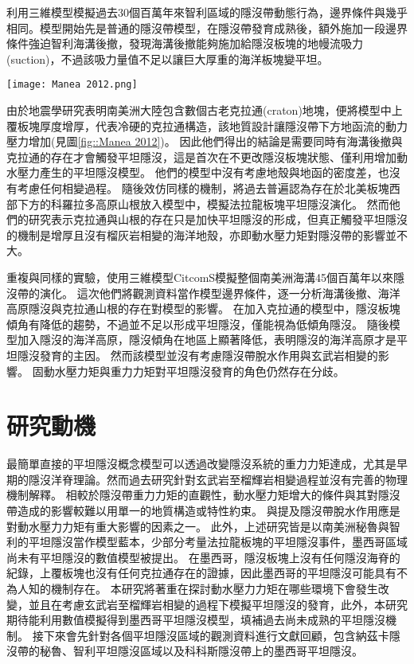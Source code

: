 \citealp{Manea2012Chile}利用三維模型模擬過去30個百萬年來智利區域的隱沒帶動態行為，邊界條件與\citealp{Thermal2012}幾乎相同。模型開始先是普通的隱沒帶模型，在隱沒帶發育成熟後，額外施加一段邊界條件強迫智利海溝後撤，發現海溝後撤能夠施加給隱沒板塊的地幔流吸力(suction)，不過該吸力量值不足以讓巨大厚重的海洋板塊變平坦。
\begin{figure*}[ht!]
    \centering
    \texttt{[image: Manea 2012.png]}
    \caption{\citealp{Manea2012Chile}中的智利平坦隱沒模型，模型中同時加入海溝後撤與增厚大陸岩石圈可以讓平坦隱沒發育。
    }
    \label{fig::Manea 2012}
\end{figure*}
由於地震學研究表明南美洲大陸包含數個古老克拉通(craton)地塊，\citealp{Manea2012Chile}便將模型中上覆板塊厚度增厚，代表冷硬的克拉通構造，該地質設計讓隱沒帶下方地函流的動力壓力增加(見圖\ref{fig::Manea 2012})。
因此他們得出的結論是需要同時有海溝後撤與克拉通的存在才會觸發平坦隱沒，這是首次在不更改隱沒板塊狀態、僅利用增加動水壓力產生的平坦隱沒模型。
他們的模型中沒有考慮地殼與地函的密度差，也沒有考慮任何相變過程。
隨後\citealp{Liu2016}效仿同樣的機制，將過去普遍認為存在於北美板塊西部下方的科羅拉多高原山根放入模型中，模擬法拉龍板塊平坦隱沒演化。
然而他們的研究表示克拉通與山根的存在只是加快平坦隱沒的形成，但真正觸發平坦隱沒的機制是增厚且沒有榴灰岩相變的海洋地殼，亦即動水壓力矩對隱沒帶的影響並不大。


\citealp{Hu2016}重複與\citealp{Manea2012Chile}同樣的實驗，使用三維模型CitcomS模擬整個南美洲海溝45個百萬年以來隱沒帶的演化。
這次他們將觀測資料當作模型邊界條件，逐一分析海溝後撤、海洋高原隱沒與克拉通山根的存在對模型的影響。
在加入克拉通的模型中，隱沒板塊傾角有降低的趨勢，不過並不足以形成平坦隱沒，僅能視為低傾角隱沒。
隨後模型加入隱沒的海洋高原，隱沒傾角在地區上顯著降低，表明隱沒的海洋高原才是平坦隱沒發育的主因。
然而該模型並沒有考慮隱沒帶脫水作用與玄武岩相變的影響。
固動水壓力矩與重力力矩對平坦隱沒發育的角色仍然存在分歧。

\section{研究動機}
最簡單直接的平坦隱沒概念模型可以透過改變隱沒系統的重力力矩達成，尤其是早期的隱沒洋脊理論。然而過去研究針對玄武岩至榴輝岩相變過程並沒有完善的物理機制解釋。
相較於隱沒帶重力力矩的直觀性，動水壓力矩增大的條件與其對隱沒帶造成的影響較難以用單一的地質構造或特性約束。
\citealp{Manea2017}與\citealp{Yan2020}提及隱沒帶脫水作用應是對動水壓力力矩有重大影響的因素之一。
此外，上述研究皆是以南美洲秘魯與智利的平坦隱沒當作模型藍本，少部分考量法拉龍板塊的平坦隱沒事件，墨西哥區域尚未有平坦隱沒的數值模型被提出。
在墨西哥，隱沒板塊上沒有任何隱沒海脊的紀錄，上覆板塊也沒有任何克拉通存在的證據，因此墨西哥的平坦隱沒可能具有不為人知的機制存在。
本研究將著重在探討動水壓力力矩在哪些環境下會發生改變，並且在考慮玄武岩至榴輝岩相變的過程下模擬平坦隱沒的發育，此外，本研究期待能利用數值模擬得到墨西哥平坦隱沒模型，填補過去尚未成熟的平坦隱沒機制。
接下來會先針對各個平坦隱沒區域的觀測資料進行文獻回顧，包含納茲卡隱沒帶的秘魯、智利平坦隱沒區域以及科科斯隱沒帶上的墨西哥平坦隱沒。


